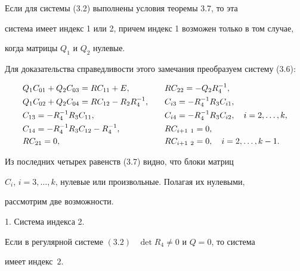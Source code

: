  


\begin{notes} 


Если для системы (3.2) выполнены условия теоремы 3.7, то эта 


система имеет индекс 1 или 2, причем индекс 1 возможен только в том случае, 


когда матрицы $Q_1$ и $Q_2$ нулевые. 


\end{notes} 


 


 


Для доказательства справедливости этого замечания преобразуем систему (3.6): 


\begin{alignat}{2}


& Q_1C_{01}+Q_2C_{03}=RC_{11}+E,&\quad &RC_{22}=-Q_2R^{-1}_4,\notag\\ 


&Q_1C_{02}+Q_2C_{04}=RC_{12}-R_2R^{-1}_4,&\quad 


&C_{i3}=-R^{-1}_4R_3C_{i1},\notag \\ 


&C_{13}=-R^{-1}_4R_3C_{11},&\quad 


&C_{i4}=-R^{-1}_4R_3C_{i2},\quad i=2,\dotsc,k,\\ 


&C_{14}=-R^{-1}_4R_3C_{12}-R^{-1}_4,&\quad 


&RC_{i+1\ 1}=0,\notag \\ 


&RC_{21}=0,&\quad &RC_{i+1\ 2}=0,\quad i=2,\dotsc,k-1.\notag 


\end{alignat} 


Из последних четырех равенств (3.7) видно, что блоки матриц 


$C_i$, $i=3,\dotsc,k$, нулевые или произвольные. Полагая их нулевыми, 


рассмотрим две возможности. 


\medskip 


 


1. Система индекса 2. 


 


\begin{thms} 


Если в регулярной системе $(3.2)$ \ $\det R_4\ne0$ и $Q=0$, то система 


имеет индекс~$2$. 


\end{thms} 


